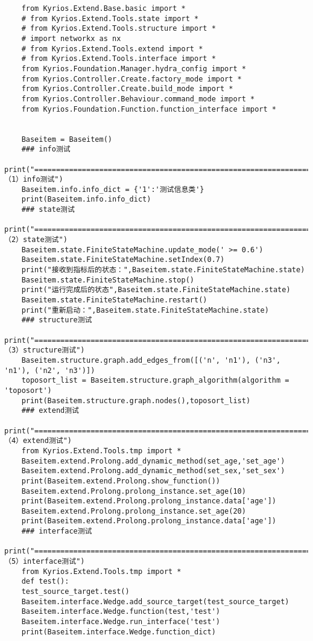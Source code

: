 \documentclass[cn,hazy,blue,14pt,screen]{elegantnote}
\begin{document}
\begin{lstlisting}
	from Kyrios.Extend.Base.basic import *
	# from Kyrios.Extend.Tools.state import *
	# from Kyrios.Extend.Tools.structure import *
	# import networkx as nx
	# from Kyrios.Extend.Tools.extend import *
	# from Kyrios.Extend.Tools.interface import *
	from Kyrios.Foundation.Manager.hydra_config import *
	from Kyrios.Controller.Create.factory_mode import *
	from Kyrios.Controller.Create.build_mode import *
	from Kyrios.Controller.Behaviour.command_mode import *
	from Kyrios.Foundation.Function.function_interface import *
	
	
	Baseitem = Baseitem()
	### info测试
	print("======================================================================== （1）info测试")
	Baseitem.info.info_dict = {'1':'测试信息类'}
	print(Baseitem.info.info_dict)
	### state测试
	print("======================================================================== （2）state测试")
	Baseitem.state.FiniteStateMachine.update_mode(' >= 0.6')
	Baseitem.state.FiniteStateMachine.setIndex(0.7)
	print("接收到指标后的状态：",Baseitem.state.FiniteStateMachine.state)
	Baseitem.state.FiniteStateMachine.stop()
	print("运行完成后的状态",Baseitem.state.FiniteStateMachine.state)
	Baseitem.state.FiniteStateMachine.restart()
	print("重新启动：",Baseitem.state.FiniteStateMachine.state)
	### structure测试
	print("======================================================================== （3）structure测试")
	Baseitem.structure.graph.add_edges_from([('n', 'n1'), ('n3', 'n1'), ('n2', 'n3')])
	toposort_list = Baseitem.structure.graph_algorithm(algorithm = 'toposort')
	print(Baseitem.structure.graph.nodes(),toposort_list)
	### extend测试
	print("======================================================================== （4）extend测试")
	from Kyrios.Extend.Tools.tmp import *
	Baseitem.extend.Prolong.add_dynamic_method(set_age,'set_age')
	Baseitem.extend.Prolong.add_dynamic_method(set_sex,'set_sex')
	print(Baseitem.extend.Prolong.show_function())
	Baseitem.extend.Prolong.prolong_instance.set_age(10)
	print(Baseitem.extend.Prolong.prolong_instance.data['age'])
	Baseitem.extend.Prolong.prolong_instance.set_age(20)
	print(Baseitem.extend.Prolong.prolong_instance.data['age'])
	### interface测试
	print("======================================================================== （5）interface测试")
	from Kyrios.Extend.Tools.tmp import *
	def test():
	test_source_target.test()
	Baseitem.interface.Wedge.add_source_target(test_source_target)
	Baseitem.interface.Wedge.function(test,'test')
	Baseitem.interface.Wedge.run_interface('test')
	print(Baseitem.interface.Wedge.function_dict)

\end{lstlisting}
\end{document}
